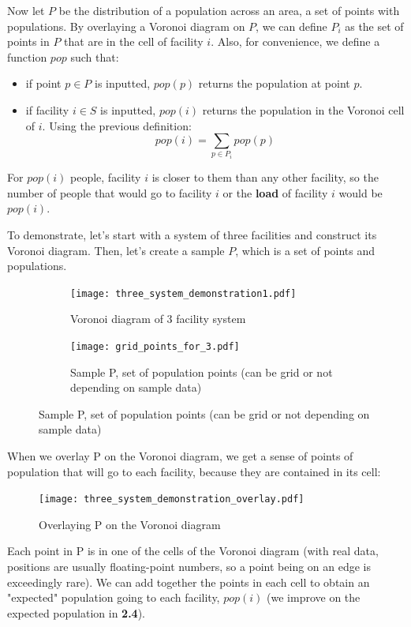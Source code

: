 \documentclass{article}
\begin{document}
Now let $P$ be the distribution of a population across an area, a set of points with populations. By overlaying a Voronoi diagram on $P$, we can define $P_i$ as the set of points in $P$ that are in the cell of facility $i$. Also, for convenience, we define a function $pop$ such that: 
\begin{itemize}
    \item if point $p \in P$ is inputted, $pop(p)$ returns the population at point $p$.
    \item if facility $i \in S$ is inputted, $pop(i)$ returns the population in the Voronoi cell of $i$. Using the previous definition:
    $$
    pop(i) = \sum_{p\in P_i} pop(p)
    $$
\end{itemize}
For $pop(i)$ people, facility $i$ is closer to them than any other facility, so the number of people that would go to facility $i$ or the \textbf{load} of facility $i$ would be $pop(i)$. 

To demonstrate, let's start with a system of three facilities and construct its Voronoi diagram. Then, let's create a sample $P$, which is a set of points and populations.

\begin{figure}[H]
\begin{subfigure}[t]{0.5\textwidth}
  \centering
  \captionsetup{justification=centering}
    \texttt{[image: three\_system\_demonstration1.pdf]}
  \caption{Voronoi diagram of 3 facility system}
  \label{fig:sub1}
\end{subfigure}%
\begin{subfigure}[t]{0.5\textwidth}
  \centering
  \captionsetup{justification=centering}
    \texttt{[image: grid\_points\_for\_3.pdf]}
  \caption{Sample P, set of population points (can be grid or not depending on sample data)}
  \label{fig:sub2}
\end{subfigure}
\end{figure}

When we overlay P on the Voronoi diagram, we get a sense of points of population that will go to each facility, because they are contained in its cell:

\begin{figure}[H]
\centering
\captionsetup{justification=centering}
\texttt{[image: three\_system\_demonstration\_overlay.pdf]}
\caption{Overlaying P on the Voronoi diagram}
\label{fig:demonstration-3-2}
\end{figure}

Each point in P is in one of the cells of the Voronoi diagram (with real data, positions are usually floating-point numbers, so a point being on an edge is exceedingly rare). We can add together the points in each cell to obtain an "expected" population going to each facility, $pop(i)$ (we improve on the expected population in \textbf{2.4}). 
\end{document}
